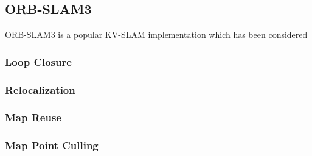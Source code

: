 \subsection{ORB-SLAM3}

ORB-SLAM3 is a popular KV-SLAM implementation which has been considered 

\subsubsection{Loop Closure}
\subsubsection{Relocalization}
\subsubsection{Map Reuse}
\subsubsection{Map Point Culling}